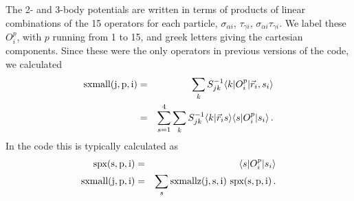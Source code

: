 \documentclass[12pt]{article}
\begin{document}
The 2- and 3-body potentials are written in terms of products of
linear combinations of the 15 operators for each particle,
$\sigma_{\alpha i}$,
$\tau_{\gamma i}$,
$\sigma_{\alpha i}\tau_{\gamma i}$. We label these $O^p_i$, with $p$ running
from 1 to 15, and greek letters giving the cartesian components.
Since these were the only operators in previous versions of the code,
we calculated
\begin{eqnarray}
{\rm sxmall(j,p,i)} &=& \sum_k S^{-1}_{jk} \langle k|O^p_i|\vec r_i, s_i\rangle
\nonumber\\
&=& \sum_{s=1}^4 \sum_k S^{-1}_{jk} \langle k|\vec r_i s\rangle 
\langle s|O^p_i|s_i\rangle \,.
\end{eqnarray}
In the code this is typically calculated as
\begin{eqnarray}
{\rm spx(s,p,i)} &=& \langle s|O^p_i|s_i\rangle
\nonumber\\
{\rm sxmall(j,p,i)} &=& \sum_s {\rm sxmallz(j,s,i)~ spx(s,p,i)} \,.
\end{eqnarray}
\end{document}
